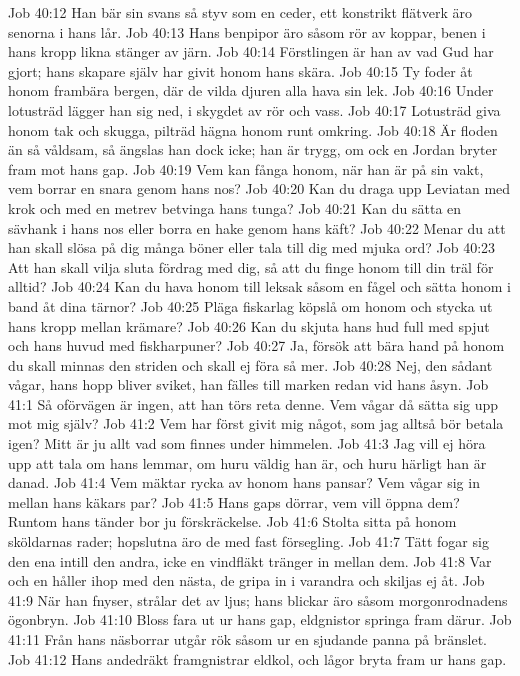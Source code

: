 Job 40:12  Han bär sin svans så styv som en ceder, ett konstrikt flätverk äro senorna i hans lår.
Job 40:13  Hans benpipor äro såsom rör av koppar, benen i hans kropp likna stänger av järn.
Job 40:14  Förstlingen är han av vad Gud har gjort; hans skapare själv har givit honom hans skära.
Job 40:15  Ty foder åt honom frambära bergen, där de vilda djuren alla hava sin lek.
Job 40:16  Under lotusträd lägger han sig ned, i skygdet av rör och vass.
Job 40:17  Lotusträd giva honom tak och skugga, pilträd hägna honom runt omkring.
Job 40:18  Är floden än så våldsam, så ängslas han dock icke; han är trygg, om ock en Jordan bryter fram mot hans gap.
Job 40:19  Vem kan fånga honom, när han är på sin vakt, vem borrar en snara genom hans nos?
Job 40:20  Kan du draga upp Leviatan med krok och med en metrev betvinga hans tunga?
Job 40:21  Kan du sätta en sävhank i hans nos eller borra en hake genom hans käft?
Job 40:22  Menar du att han skall slösa på dig många böner eller tala till dig med mjuka ord?
Job 40:23  Att han skall vilja sluta fördrag med dig, så att du finge honom till din träl för alltid?
Job 40:24  Kan du hava honom till leksak såsom en fågel och sätta honom i band åt dina tärnor?
Job 40:25  Pläga fiskarlag köpslå om honom och stycka ut hans kropp mellan krämare?
Job 40:26  Kan du skjuta hans hud full med spjut och hans huvud med fiskharpuner?
Job 40:27  Ja, försök att bära hand på honom du skall minnas den striden och skall ej föra så mer.
Job 40:28  Nej, den sådant vågar, hans hopp bliver sviket, han fälles till marken redan vid hans åsyn.
Job 41:1  Så oförvägen är ingen, att han törs reta denne. Vem vågar då sätta sig upp mot mig själv?
Job 41:2  Vem har först givit mig något, som jag alltså bör betala igen? Mitt är ju allt vad som finnes under himmelen.
Job 41:3  Jag vill ej höra upp att tala om hans lemmar, om huru väldig han är, och huru härligt han är danad.
Job 41:4  Vem mäktar rycka av honom hans pansar? Vem vågar sig in mellan hans käkars par?
Job 41:5  Hans gaps dörrar, vem vill öppna dem? Runtom hans tänder bor ju förskräckelse.
Job 41:6  Stolta sitta på honom sköldarnas rader; hopslutna äro de med fast försegling.
Job 41:7  Tätt fogar sig den ena intill den andra, icke en vindfläkt tränger in mellan dem.
Job 41:8  Var och en håller ihop med den nästa, de gripa in i varandra och skiljas ej åt.
Job 41:9  När han fnyser, strålar det av ljus; hans blickar äro såsom morgonrodnadens ögonbryn.
Job 41:10  Bloss fara ut ur hans gap, eldgnistor springa fram därur.
Job 41:11  Från hans näsborrar utgår rök såsom ur en sjudande panna på bränslet.
Job 41:12  Hans andedräkt framgnistrar eldkol, och lågor bryta fram ur hans gap.
